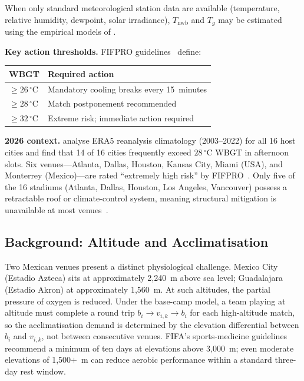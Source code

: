 \documentclass[12pt, letterpaper]{article}
\begin{document}
When only standard meteorological station data are available
(temperature, relative humidity, dewpoint, solar irradiance),
$T_\mathrm{nwb}$ and $T_g$ may be estimated using the empirical models
of \citet{Liljegren2008}.

\medskip
\textbf{Key action thresholds.}
FIFPRO guidelines~\citep{FIFPRO2025} define:

\begin{center}
\begin{tabular}{@{}lp{8cm}@{}}
\toprule
WBGT & Required action \\
\midrule
$\geq 26\,^\circ$C & Mandatory cooling breaks every 15~minutes \\
$\geq 28\,^\circ$C & Match postponement recommended \\
$\geq 32\,^\circ$C & Extreme risk; immediate action required \\
\bottomrule
\end{tabular}
\end{center}

\medskip
\textbf{2026 context.}
\citet{MullanEtAl2025} analyse ERA5 reanalysis climatology (2003--2022)
for all 16 host cities and find that 14 of 16 cities frequently exceed
$28\,^\circ$C WBGT in afternoon slots.  Six venues---Atlanta, Dallas,
Houston, Kansas City, Miami (USA), and Monterrey (Mexico)---are rated
``extremely high risk'' by FIFPRO~\citep{FIFPRO2025}.  Only five of the
16 stadiums (Atlanta, Dallas, Houston, Los Angeles, Vancouver) possess
a retractable roof or climate-control system, meaning structural
mitigation is unavailable at most
venues~\citep{WorldWeatherAttribution2026}.

\subsection{Background: Altitude and Acclimatisation}

Two Mexican venues present a distinct physiological challenge.
Mexico City (Estadio Azteca) sits at approximately 2{,}240~m above sea
level; Guadalajara (Estadio Akron) at approximately 1{,}560~m.  At such
altitudes, the partial pressure of oxygen is reduced.  Under the base-camp model, a team playing at altitude must
complete a round trip $b_i \!\to\! v_{i,k} \!\to\! b_i$ for each
high-altitude match, so the acclimatisation demand is determined by the
elevation differential between $b_i$ and $v_{i,k}$, not between
consecutive venues.  FIFA's sports-medicine guidelines recommend a
minimum of ten days at elevations above 3{,}000~m; even moderate
elevations of 1{,}500$+$~m can reduce aerobic performance within a
standard three-day rest window.
\end{document}
